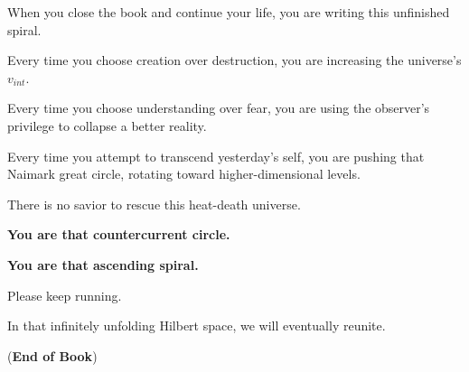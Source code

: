 When you close the book and continue your life, you are writing this unfinished spiral.

Every time you choose creation over destruction, you are increasing the universe's $v_{int}$.

Every time you choose understanding over fear, you are using the observer's privilege to collapse a better reality.

Every time you attempt to transcend yesterday's self, you are pushing that Naimark great circle, rotating toward higher-dimensional levels.

There is no savior to rescue this heat-death universe.

\textbf{You are that countercurrent circle.}

\textbf{You are that ascending spiral.}

Please keep running.

In that infinitely unfolding Hilbert space, we will eventually reunite.

(\textbf{End of Book})

